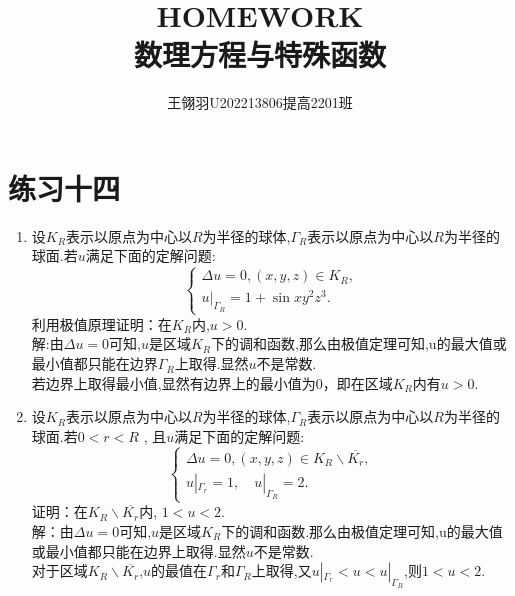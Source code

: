 \documentclass[11pt]{article}
\begin{document}
\title{\vspace{-2cm}HOMEWORK\\ 数理方程与特殊函数}
\author{王翎羽\quad U202213806\quad 提高2201班}
\maketitle

\section*{练习十四}
\begin{enumerate}
    \item 设$K_R$表示以原点为中心以$R$为半径的球体,$\Gamma_R$表示以原点为中心以$R$为半径的球面.若$u$满足下面的定解问题:
     \begin{equation*}
        \left\{
         \begin{array}{lr}
         \Delta u = 0, (x,y,z)\in K_R, \\
         u |_{\Gamma_R} = 1 + \sin xy^2 z^3.
         \end{array}
        \right.
     \end{equation*}
    利用极值原理证明：在$K_R$内,$u>0$.\\
    解:由$\Delta u =0$可知,$u$是区域$K_R$下的调和函数,那么由极值定理可知,u的最大值或最小值都只能在边界$\Gamma_R$上取得.显然$u$不是常数.\\
    若边界上取得最小值,显然有边界上的最小值为0，即在区域$K_R$内有$u>0$.


    \item 设$K_R$表示以原点为中心以$R$为半径的球体,$\Gamma_R$表示以原点为中心以$R$为半径的球面.若$0<r<R$ , 且$u$满足下面的定解问题:
       \begin{equation*}
    \left\{
     \begin{array}{lr}
     \Delta u = 0, (x,y,z)\in K_R  \backslash \overline{K_r}, \\
     u|_{\Gamma_r}=1,\quad u|_{\Gamma_R}=2.
     \end{array}
    \right.
    \end{equation*}
    证明：在$K_R  \backslash \overline{K_r}$内, $1<u<2$.\\
        解：由$\Delta u =0$可知,$u$是区域$K_R$下的调和函数.那么由极值定理可知,u的最大值或最小值都只能在边界上取得.显然$u$不是常数.\\
    对于区域$K_R \backslash \overline{K_r}$,$u$的最值在$\Gamma_r$和$\Gamma_R$上取得,又$u|_{\Gamma_r}<u<u|_{\Gamma_R}$,则$1<u<2$.



\end{enumerate}
\end{document}

